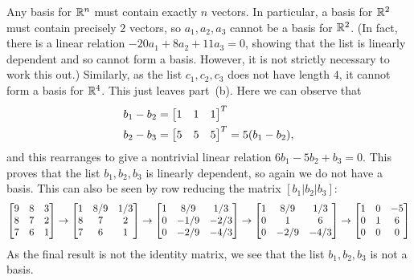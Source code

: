 \documentclass[a4paper]{amsart}
\renewenvironment{solution}{\SolutionInline}{\endSolutionInline}
\begin{document}
\begin{solution}
 Any basis for ${\mathbb{R}}^n$ must contain exactly $n$ vectors.  In
 particular, a basis for ${\mathbb{R}}^2$ must contain precisely $2$ vectors, so
 $a_1,a_2,a_3$ cannot be a basis for ${\mathbb{R}}^2$.  (In fact, there is a
 linear relation $-20a_1+8a_2+11a_3=0$, showing that the list is
 linearly dependent and so cannot form a basis.  However, it is not
 strictly necessary to work this out.)  Similarly, as the list
 $c_1,c_2,c_3$ does not have length $4$, it cannot form a basis for
 ${\mathbb{R}}^4$.  This just leaves part~(b).  Here we can observe that
 \begin{align*} 
  b_1-b_2 &= \left[\begin{matrix} 1&1&1\end{matrix}\right]^T \\
  b_2-b_3 &= \left[\begin{matrix} 5&5&5\end{matrix}\right]^T = 5(b_1-b_2),
 \end{align*}
 and this rearranges to give a nontrivial linear relation
 $6b_1-5b_2+b_3=0$.  This proves that the list $b_1,b_2,b_3$ is
 linearly dependent, so again we do not have a basis.  This can also
 be seen by row reducing the matrix $[b_1|b_2|b_3]$:
 \[ 
  \left[\begin{matrix} 9 & 8 & 3 \\
       8 & 7 & 2 \\
       7 & 6 & 1 \end{matrix}\right] \to
  \left[\begin{matrix} 1 & 8/9 & 1/3 \\
       8 &   7 &   2 \\ 
       7 &   6 &   1 \end{matrix}\right] \to
  \left[\begin{matrix} 1 &  8/9 &  1/3 \\
       0 & -1/9 & -2/3 \\ 
       0 & -2/9 & -4/3 \end{matrix}\right] \to
  \left[\begin{matrix} 1 &  8/9 &  1/3 \\
       0 &    1 &    6 \\ 
       0 & -2/9 & -4/3 \end{matrix}\right] \to
  \left[\begin{matrix} 1 &    0 &  -5 \\
       0 &    1 &   6 \\ 
       0 &    0 &   0 \end{matrix}\right]
 \]
 As the final result is not the identity matrix, we see that the list
 $b_1,b_2,b_3$ is not a basis.
\end{solution}
\end{document}
